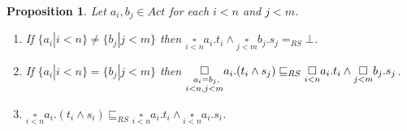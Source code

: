 \documentclass{elsarticle}
\theoremstyle{plain}
\newtheorem{proposition}[theorem]{Proposition}
\theoremstyle{definition}
\begin{document}
\begin{proposition}\label{L:MULTIPLE_VI}
Let $a_i, b_j \in Act$ for each $i<n$ and $j<m$.
  \begin{enumerate}
    \item If $\{a_i|i< n\}\neq \{b_j|j< m\}$ then $\underset{i< n}{\square}a_i.t_i \wedge \underset{j< m }{\square} b_j.s_j =_{RS} \bot$.
    \item If $\{a_i|i<n\}=\{b_j|j<m\}$ then
     $\underset{\begin{subarray}
                   \;\;\;\;a_i= b_j,\\
                   i< n,j<m
                \end{subarray}} {\square}a_i.(t_i \wedge s_j) \sqsubseteq_{RS} \underset{i< n}{\square}a_i.t_i \wedge \underset{j< m}{\square}b_j.s_j$.
    \item $\underset{i< n} {\square}a_i.(t_i \wedge s_i) \sqsubseteq_{RS} \underset{i< n}{\square}a_i.t_i \wedge \underset{i< n}{\square}a_i.s_i$.
  \end{enumerate}
\end{proposition}
\end{document}
